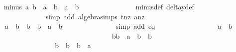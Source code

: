 \begin{isabellebody}
\ \isamarkupfalse%
\ {\isachardoublequoteopen}{\isasymdelta}{\isacharunderscore}minus\ a{}\ b{}\ {\isacharequal}\ a{}\ {\isacharasterisk}\ b{}\ {\isacharplus}\ a{}\ {\isacharasterisk}\ b{}{\isachardoublequoteclose}\isanewline
\ \ \ \ \ \ \ \ \ \ \ \ \ \ \isamarkupfalse%
\ {\isasymdelta}{\isacharunderscore}minus{\isacharunderscore}def\ delta{\isacharunderscore}y{\isacharunderscore}def\ \isanewline
\ \ \ \ \ \ \ \ \ \ \ \ \ \ \isamarkupfalse%
{\isacharparenleft}simp\ add{\isacharcolon}\ algebra{\isacharunderscore}simps\ t{\isacharunderscore}nz\ a{}{\isacharunderscore}nz{\isacharparenright}\isanewline
\ \ \ \ \ \ \ \ \ \ \ \ \isanewline
\ \ \ \ \ \ \ \ \ \ \ \ \isamarkupfalse%
\ \isamarkupfalse%
\ {\isachardoublequoteopen}{\isachardot}{\isachardot}{\isachardot}\ {\isacharequal}\ a{}\ {\isacharasterisk}\ {\isacharparenleft}b{}\ {\isacharslash}\ b{}{\isacharparenright}\ {\isacharasterisk}\ b{}\ {\isacharplus}\ a{}\ {\isacharasterisk}\ b{}{\isachardoublequoteclose}\isanewline
\ \ \ \ \ \ \ \ \ \ \ \ \ \ \isamarkupfalse%
{\isacharparenleft}simp\ add{\isacharcolon}\ eq{}{\isacharparenright}\isanewline
\ \ \ \ \ \ \ \ \ \ \ \ \isamarkupfalse%
\ \isamarkupfalse%
\ {\isachardoublequoteopen}{\isachardot}{\isachardot}{\isachardot}\ {\isacharequal}\ {\isacharparenleft}a{}{\isacharcircum}{}\ {\isacharminus}\ b{}{\isacharcircum}{}{\isacharparenright}{\isachardoublequoteclose}\ \isanewline
\ \ \ \ \ \ \ \ \ \ \ \ \ \ \isamarkupfalse%
\ \isanewline
\ \ \ \ \ \ \ \ \ \ \ \ \isamarkupfalse%
\ \isamarkupfalse%
\ {\isachardoublequoteopen}{\isachardot}{\isachardot}{\isachardot}\ {\isacharequal}\ b{}{\isacharasterisk}b{}\ {\isacharminus}\ a{}{\isacharcircum}{}\ {\isacharasterisk}\ {\isacharparenleft}b{}\ {\isacharslash}\ b{}{\isacharparenright}{\isachardoublequoteclose}\ \isanewline
\ \ \ \ \ \ \ \ \ \ \ \ \ \ \ \ \isamarkupfalse%
\isanewline
\ \ \ \ \ \ \ \ \ \ \ \ \isamarkupfalse%
\ \isamarkupfalse%
\ {\isachardoublequoteopen}{\isachardot}{\isachardot}{\isachardot}\ {\isacharequal}\ {\isacharparenleft}b{}\ {\isacharslash}\ b{}{\isacharparenright}\ {\isacharasterisk}\ {\isacharparenleft}b{}{\isacharcircum}{}\ {\isacharminus}\ a{}{\isacharcircum}{}{\isacharparenright}{\isachardoublequoteclose}\isanewline

\end{isabellebody}
